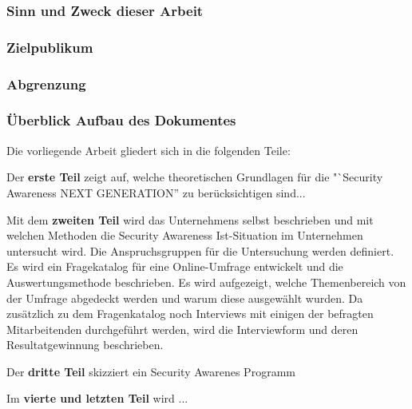 \documentclass[../../main.tex]{subfiles}
\begin{document}

\subsubsection*{Sinn und Zweck dieser Arbeit}

\subsubsection*{Zielpublikum}

\subsubsection*{Abgrenzung}

\subsubsection*{Überblick Aufbau des Dokumentes}

Die vorliegende Arbeit gliedert sich in die folgenden Teile:

\begin{sloppypar}
Der \textbf{erste Teil} zeigt auf, welche theoretischen Grundlagen für die "`Security Awareness NEXT GENERATION'' zu berücksichtigen sind...
\end{sloppypar}

\begin{sloppypar}
Mit dem \textbf{zweiten Teil} wird das Unternehmens selbst beschrieben und mit welchen Methoden die Security Awareness Ist-Situation im Unternehmen untersucht wird. Die Anspruchsgruppen für die Untersuchung werden definiert. Es wird ein Fragekatalog für eine Online-Umfrage entwickelt und die Auswertungsmethode beschrieben. Es wird aufgezeigt, welche Themenbereich von der Umfrage abgedeckt werden und warum diese ausgewählt wurden. Da zusätzlich zu dem Fragenkatalog noch Interviews mit einigen der befragten Mitarbeitenden durchgeführt werden, wird die Interviewform und deren Resultatgewinnung beschrieben.
\end{sloppypar}

\begin{sloppypar}
Der \textbf{dritte Teil} skizziert ein Security Awarenes Programm
\end{sloppypar}

\begin{sloppypar}
Im \textbf{vierte und letzten Teil} wird ...
\end{sloppypar}
\end{document}
